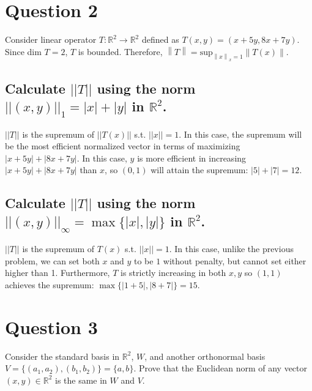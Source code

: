 \documentclass[11pt]{article} %
\newcommand{\norm}[1]{\left\lVert#1\right\rVert}
\begin{document}
\section{Question 2}
Consider linear operator $T: \mathbb{R}^2 \rightarrow \mathbb{R}^2$ defined as $T(x,y) = (x+5y,8x+7y)$. Since dim $T = 2$, $T$ is bounded. Therefore, $\norm{T} = \text{sup}_{\norm{x}_x = 1}\norm{T(x)}$.
\subsection{Calculate $||T||$ using the norm $||(x,y)||_1 = |x| + |y|$ in $\mathbb{R}^2$.}
$||T||$ is the supremum of $||T(x)||$ s.t. $||x||=1$. In this case, the supremum will be the most efficient normalized vector in terms of maximizing $|x+5y| + |8x + 7y|.$ In this case, $y$ is more efficient in increasing $|x+5y| + |8x + 7y|$ than $x$, so $(0,1)$ will attain the supremum: $|5|+|7| = 12.$
\subsection{Calculate $||T||$ using the norm $||(x,y)||_{\infty} = \max \{|x|,|y| \}$ in $\mathbb{R}^2$.}
$||T||$ is the supremum of $T(x)$ s.t. $||x||=1$. In this case, unlike the previous problem, we can set both $x$ and $y$ to be $1$ without penalty, but cannot set either higher than 1. Furthermore, $T$ is strictly increasing in both $x,y$ so $(1,1)$ achieves the supremum: $\max \{ |1 + 5|,|8 + 7|\} = 15.$

\section{Question 3}
Consider the standard basis in $\mathbb{R}^2$, $W$, and another orthonormal basis $V = \{ (a_1,a_2),(b_1,b_2)\} = \{a,b\}$. Prove that the Euclidean norm of any vector $(x,y) \in \mathbb{R}^2$ is the same in $W$ and $V$.
\end{document}
